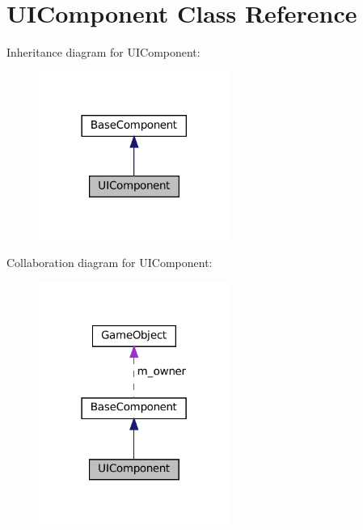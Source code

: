 \hypertarget{classUIComponent}{}\section{U\+I\+Component Class Reference}
\label{classUIComponent}


Inheritance diagram for U\+I\+Component\+:\nopagebreak
\begin{figure}[H]
\begin{center}
\leavevmode
\includegraphics[width=177pt]{classUIComponent__inherit__graph}
\end{center}
\end{figure}


Collaboration diagram for U\+I\+Component\+:\nopagebreak
\begin{figure}[H]
\begin{center}
\leavevmode
\includegraphics[width=178pt]{classUIComponent__coll__graph}
\end{center}
\end{figure}
